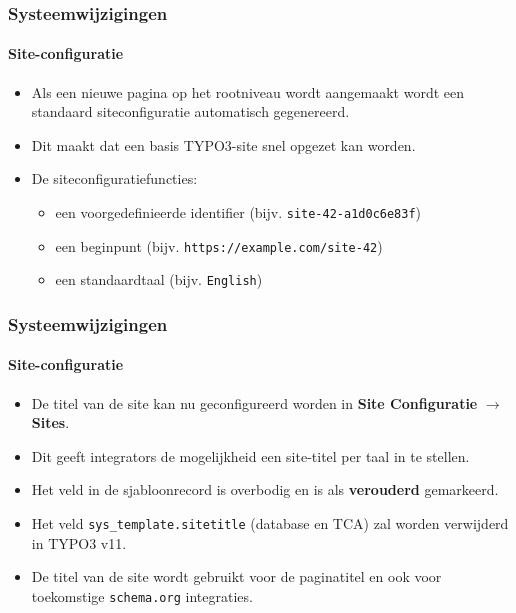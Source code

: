 
\begin{frame}[fragile]
	\frametitle{Systeemwijzigingen}
	\framesubtitle{Site-configuratie}

	\begin{itemize}
		\item Als een nieuwe pagina op het rootniveau wordt aangemaakt wordt een
			standaard siteconfiguratie automatisch gegenereerd.
		\item Dit maakt dat een basis TYPO3-site snel opgezet kan worden.
		\item De siteconfiguratiefuncties:

		\begin{itemize}
			\item een voorgedefinieerde identifier (bijv. \texttt{site-42-a1d0c6e83f})
			\item een beginpunt (bijv. \texttt{https://example.com/site-42})
			\item een standaardtaal (bijv. \texttt{English})
		\end{itemize}

	\end{itemize}

\end{frame}


\begin{frame}[fragile]
	\frametitle{Systeemwijzigingen}
	\framesubtitle{Site-configuratie}

	\begin{itemize}

		\item De titel van de site kan nu geconfigureerd worden in
			\textbf{Site Configuratie} $\rightarrow$ \textbf{Sites}.
		\item Dit geeft integrators de mogelijkheid een site-titel per taal in te stellen.
		\item Het veld in de sjabloonrecord is overbodig en is als \textbf{verouderd} gemarkeerd.
		\item Het veld \texttt{sys\_template.sitetitle} (database en TCA) zal worden verwijderd in TYPO3 v11.
		\item De titel van de site wordt gebruikt voor de paginatitel en ook voor toekomstige
			\texttt{schema.org} integraties.
	\end{itemize}

\end{frame}

